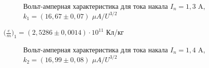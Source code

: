 \documentclass[a4paper,12pt]{article}
\begin{document}
\begin{figure} 
	\centering
	\caption{Вольт-амперная характеристика для тока накала $I_n = 1,3$ A, $k_1 = (16,67 \pm 0,07)$ $\mu A/U^{3/2}$}
	\label{mah}
\end{figure}

\par $\big(\frac{e}{m}\big)_1 = (2,5286 \pm 0,0014) \cdot 10^{11}$ Кл/кг

\begin{figure} 
	\centering
	\caption{Вольт-амперная характеристика для тока накала $I_n = 1,4$ A, $k_2 = (16,99 \pm 0,08)$ $\mu A/U^{3/2}$}
	\label{mah}
\end{figure}
\end{document}
